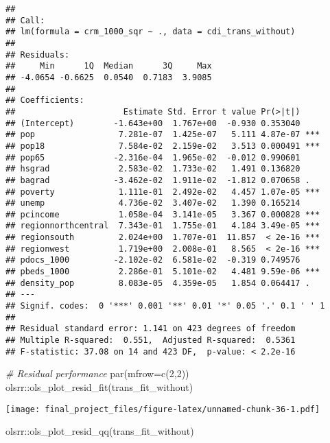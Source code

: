 \documentclass[
]{article}
\newenvironment{Shaded}{\begin{snugshade}}{\end{snugshade}}
\newcommand{\AttributeTok}[1]{\textcolor[rgb]{0.77,0.63,0.00}{#1}}
\newcommand{\CommentTok}[1]{\textcolor[rgb]{0.56,0.35,0.01}{\textit{#1}}}
\newcommand{\DecValTok}[1]{\textcolor[rgb]{0.00,0.00,0.81}{#1}}
\newcommand{\FunctionTok}[1]{\textcolor[rgb]{0.00,0.00,0.00}{#1}}
\newcommand{\NormalTok}[1]{#1}
\newcommand{\SpecialCharTok}[1]{\textcolor[rgb]{0.00,0.00,0.00}{#1}}
\begin{document}
\begin{verbatim}
## 
## Call:
## lm(formula = crm_1000_sqr ~ ., data = cdi_trans_without)
## 
## Residuals:
##     Min      1Q  Median      3Q     Max 
## -4.0654 -0.6625  0.0540  0.7183  3.9085 
## 
## Coefficients:
##                      Estimate Std. Error t value Pr(>|t|)    
## (Intercept)        -1.643e+00  1.767e+00  -0.930 0.353040    
## pop                 7.281e-07  1.425e-07   5.111 4.87e-07 ***
## pop18               7.584e-02  2.159e-02   3.513 0.000491 ***
## pop65              -2.316e-04  1.965e-02  -0.012 0.990601    
## hsgrad              2.583e-02  1.733e-02   1.491 0.136820    
## bagrad             -3.462e-02  1.911e-02  -1.812 0.070658 .  
## poverty             1.111e-01  2.492e-02   4.457 1.07e-05 ***
## unemp               4.736e-02  3.407e-02   1.390 0.165214    
## pcincome            1.058e-04  3.141e-05   3.367 0.000828 ***
## regionnorthcentral  7.343e-01  1.755e-01   4.184 3.49e-05 ***
## regionsouth         2.024e+00  1.707e-01  11.857  < 2e-16 ***
## regionwest          1.719e+00  2.008e-01   8.565  < 2e-16 ***
## pdocs_1000         -2.102e-02  6.581e-02  -0.319 0.749576    
## pbeds_1000          2.286e-01  5.101e-02   4.481 9.59e-06 ***
## density_pop         8.083e-05  4.359e-05   1.854 0.064417 .  
## ---
## Signif. codes:  0 '***' 0.001 '**' 0.01 '*' 0.05 '.' 0.1 ' ' 1
## 
## Residual standard error: 1.141 on 423 degrees of freedom
## Multiple R-squared:  0.551,  Adjusted R-squared:  0.5361 
## F-statistic: 37.08 on 14 and 423 DF,  p-value: < 2.2e-16
\end{verbatim}

\begin{Shaded}
\begin{Highlighting}[]
\CommentTok{\# Residual performance}
\FunctionTok{par}\NormalTok{(}\AttributeTok{mfrow=}\FunctionTok{c}\NormalTok{(}\DecValTok{2}\NormalTok{,}\DecValTok{2}\NormalTok{))}
\NormalTok{olsrr}\SpecialCharTok{::}\FunctionTok{ols\_plot\_resid\_fit}\NormalTok{(trans\_fit\_without)}
\end{Highlighting}
\end{Shaded}

\texttt{[image: final\_project\_files/figure-latex/unnamed-chunk-36-1.pdf]}

\begin{Shaded}
\begin{Highlighting}[]
\NormalTok{olsrr}\SpecialCharTok{::}\FunctionTok{ols\_plot\_resid\_qq}\NormalTok{(trans\_fit\_without)}
\end{Highlighting}
\end{Shaded}
\end{document}
